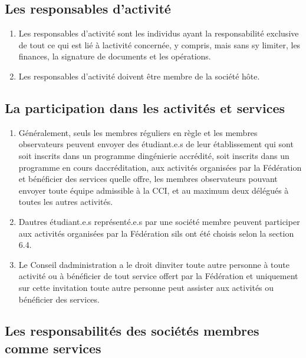 \subsection{Les responsables d'activité}
\label{les-responsables-d-activite}

\begin{enumerate}
 \item
  Les responsables d'activité sont les individus ayant la responsabilité exclusive de tout ce qui est lié à l\textquotesingle activité concernée, y compris, mais sans s\textquotesingle y limiter, les finances, la signature de documents et les opérations.
 \item
  Les responsables d'activité doivent être membre de la société hôte.
\end{enumerate}

\subsection{La participation dans les activités et services}
\label{la-participation-dans-les-activites-et-services}

\begin{enumerate}
 \item
  Généralement, seuls les membres réguliers en règle et les membres observateurs peuvent envoyer des étudiant.e.s de leur établissement qui sont soit inscrits dans un programme d\textquotesingle ingénierie accrédité, soit inscrits dans un programme en cours d\textquotesingle accréditation, aux activités organisées par la Fédération et bénéficier des services qu\textquotesingle elle offre, les membres observateurs pouvant envoyer toute équipe admissible à la CCI, et au maximum deux délégués à toutes les autres activités.
 \item
  D\textquotesingle autres étudiant.e.s représenté.e.s par une société membre peuvent participer aux activités organisées par la Fédération s\textquotesingle ils ont été choisis selon la section 6.4.
 \item
  Le Conseil d\textquotesingle administration a le droit d\textquotesingle inviter toute autre personne à toute activité ou à bénéficier de tout service offert par la Fédération et uniquement sur cette invitation toute autre personne peut assister aux activités ou bénéficier des services.
\end{enumerate}

\subsection{Les responsabilités des sociétés membres comme services}
\label{les-responsabilites-des-societes-membres-comme-services}

